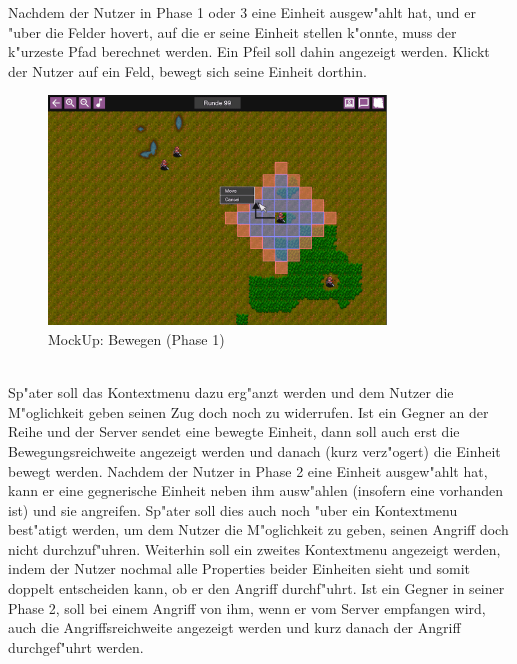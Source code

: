 \documentclass[12pt, titlepage]{scrartcl}
\newcounter{subsubsubsection}[subsubsection]
\begin{document}
                    Nachdem der Nutzer in Phase 1 oder 3 eine Einheit ausgew"ahlt hat, und er "uber die Felder hovert, auf die er seine Einheit stellen k"onnte, muss der k"urzeste Pfad berechnet werden. Ein Pfeil soll dahin angezeigt werden. Klickt der Nutzer auf ein Feld, bewegt sich seine Einheit dorthin. \\
                    \begin{figure}[H] 
    				    \centering
    				    \includegraphics[width=0.8\textwidth]{images/mockUps/Move.png}
    				    \caption{MockUp: Bewegen (Phase 1)}
    				    \label{Move}
			        \end{figure}
                    \ \\ Sp"ater soll das Kontextmenu dazu erg"anzt werden und dem Nutzer die M"oglichkeit geben seinen Zug doch noch zu widerrufen. Ist ein Gegner an der Reihe und der Server sendet eine bewegte Einheit, dann soll auch erst die Bewegungsreichweite angezeigt werden und danach (kurz verz"ogert) die Einheit bewegt werden.
			        Nachdem der Nutzer in Phase 2 eine Einheit ausgew"ahlt hat, kann er eine gegnerische Einheit neben ihm ausw"ahlen (insofern eine vorhanden ist) und sie angreifen. Sp"ater soll dies auch noch "uber ein Kontextmenu best"atigt werden, um dem Nutzer die M"oglichkeit zu geben, seinen Angriff doch nicht durchzuf"uhren. Weiterhin soll ein zweites Kontextmenu angezeigt werden, indem der Nutzer nochmal alle Properties beider Einheiten sieht und somit doppelt entscheiden kann, ob er den Angriff durchf"uhrt. Ist ein Gegner in seiner Phase 2, soll bei einem Angriff von ihm, wenn er vom Server empfangen wird, auch die Angriffsreichweite angezeigt werden und kurz danach der Angriff durchgef"uhrt werden.
\end{document}
